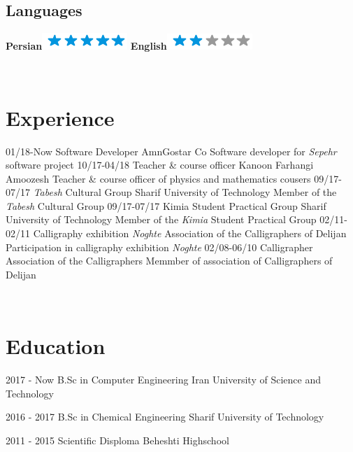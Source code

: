 \documentclass[a4paper]{friggeri-cv}
\begin{document}
\begin{aside}
  \section{Languages}
   \textbf{Persian}\includegraphics[scale=0.40]{img/5stars.png}
    \textbf{English}\includegraphics[scale=0.40]{img/2stars.png}
    ~
\end{aside}
~
\section{Experience}
\begin{entrylist}
  \entry
    {01/18-Now}
    {    Software Developer}
    {AmnGostar Co}
    {Software developer for \emph{Sepehr} software project}
  \entry
    {10/17-04/18}
    {    Teacher \& course officer}
    {Kanoon Farhangi Amoozesh}
    {Teacher \& course officer of physics and mathematics cousers}
  \entry
    {09/17-07/17}
    {   \emph{Tabesh} Cultural Group}
    {Sharif University of Technology}
     {Member of the \emph{Tabesh} Cultural Group}
    \entry
    {09/17-07/17}
    {   Kimia Student Practical Group}
    {Sharif University of Technology}
    {Member of the \emph{Kimia} Student Practical Group}
    \entry
    {02/11-02/11}
    {    Calligraphy exhibition \emph{Noghte}}
    {Association of the Calligraphers of Delijan}
    {Participation in calligraphy exhibition \emph{Noghte}}
    \entry
    {02/08-06/10}
    {   Calligrapher}
    {Association of the Calligraphers}
    {Memmber of association of Calligraphers of Delijan}
\end{entrylist}
\\
\section{Education}
\begin{entrylist}
  \entry
    {2017 - Now}
    {     B.Sc in Computer Engineering}
    {Iran University of Science and Technology}
    {}

  \entry
    {2016 - 2017}
    {    B.Sc in Chemical Engineering}
    {Sharif University of Technology}
    {}

  \entry
    {2011 - 2015}
    {    Scientific Disploma}
    {Beheshti Highschool}
  {}
\end{entrylist}
\end{document}
